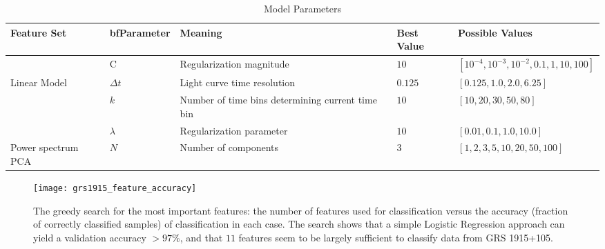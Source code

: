 \documentclass[12pt]{emulateapj}
\begin{document}
\begin{table*}[hbtp]
\renewcommand{\arraystretch}{1.3}
\footnotesize
\caption{Model Parameters}
\begin{threeparttable} 
\begin{tabularx}{\textwidth}{p{2.0cm}p{10.0cm}X}%
\toprule
\bf{Feature Set} & bf{Parameter} & \bf{Meaning} & Best Value &  \bf{Possible Values} \\ \midrule
		& C & Regularization magnitude & $10$ & $[10^{-4}, 10^{-3}, 10^{-2}, 0.1, 1, 10, 100]$ \\ \midrule
 Linear Model & $\Delta t$ & Light curve time resolution & $0.125$ & $[0.125, 1.0, 2.0, 6.25]$ \\
		& $k$ & Number of time bins determining current time bin & $10$ & $[10, 20, 30, 50, 80]$ \\
		& $\lambda$ & Regularization parameter & $10$ & $[0.01, 0.1, 1.0, 10.0]$ \\ \midrule
Power spectrum PCA & $N$ & Number of components & $3$ & $[1,2,3,5,10,20,50,100]$ \\

 \bottomrule
\end{tabularx}
   \begin{tablenotes}
      \item{}
\end{tablenotes}
\end{threeparttable}
\label{tab:parameters}
\end{table*}

\begin{figure*}[htbp]
\begin{center}
\texttt{[image: grs1915\_feature\_accuracy]}
\caption{The greedy search for the most important features: the number of features used for classification versus the accuracy (fraction of correctly classified samples) of classification in each case. The search shows that a simple Logistic Regression approach can yield a validation accuracy $>97\%$, and that $11$ features seem to be largely sufficient to classify data from GRS 1915+105.}
\label{fig:asm_total}
\end{center}
\end{figure*}
\end{document}
